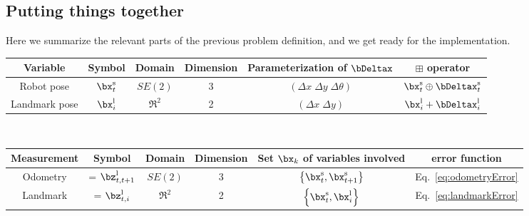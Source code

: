 \documentclass[a4paper]{article}
\begin{document}
\subsection{Putting things together}
Here we summarize the relevant parts of the previous problem definition,
and we get ready for the implementation.\\[.3em]
{\small
\begin{tabular}{|c|c|c|c|c|c|}
\hline
\textbf{Variable} & \textbf{Symbol}  & \textbf{Domain} & \textbf{Dimension} & \textbf{Parameterization of }$\bDeltax$   & $\boxplus$ \textbf{operator} \\
\hline
Robot    pose     & $\bx^\mathrm{s}_t$ & $SE(2)$         & 3                  & $(\Delta x \; \Delta y \; \Delta\theta)$  & $\bx^\mathrm{s}_t \oplus \bDeltax^\mathrm{s}_t$ \\
\hline
Landmark pose     & $\bx^\mathrm{l}_i$ & $\Re^2$         & 2                  & $(\Delta x \; \Delta y )$                 & $\bx^\mathrm{l}_i + \bDeltax^\mathrm{l}_i$\\
\hline
\end{tabular}\\[.3em]
\begin{tabular}{|c|c|c|c|c|c|}
\hline
\textbf{Measurement} & \textbf{Symbol}         & \textbf{Domain} & \textbf{Dimension} & \textbf{Set $\bx_k$ of variables involved}             & \textbf{error function}\\
\hline
Odometry             & = $\bz^\mathrm{l}_{t,t+1}$ & $SE(2)$         & 3                  & $\left\{ \bx^\mathrm{s}_t, \bx^\mathrm{s}_{t+1} \right\}$ & Eq.~\ref{eq:odometryError} \\
\hline
Landmark             & = $\bz^\mathrm{l}_{t,i}$   & $\Re^2$         & 2                  & $\left\{ \bx^\mathrm{s}_t, \bx^\mathrm{l}_{i} \right\}$  & Eq.~\ref{eq:landmarkError} \\
\hline
\end{tabular}}\\[.3em]
\end{document}
